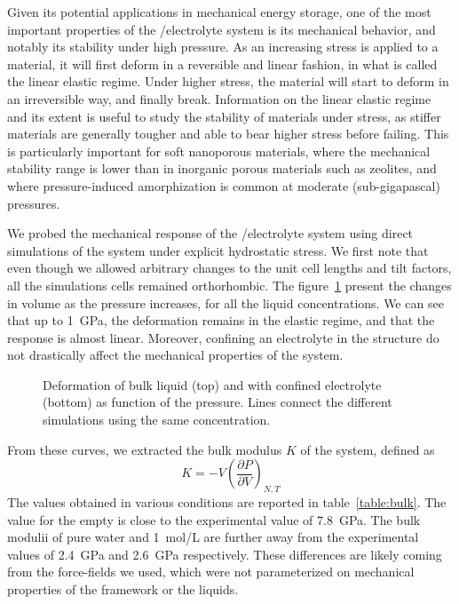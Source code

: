 \documentclass[thesis]{subfiles}
\begin{document}
Given its potential applications in mechanical energy storage, one of the most
important properties of the /electrolyte system is its mechanical behavior,
and notably its stability under high pressure. As an increasing stress is
applied to a material, it will first deform in a reversible and linear fashion,
in what is called the linear elastic regime. Under higher stress, the
material will start to deform in an irreversible way, and finally break.
Information on the linear elastic regime and its extent is useful to study the
stability of materials under stress, as stiffer materials are generally tougher
and able to bear higher stress before failing. This is particularly important
for soft nanoporous materials, where the mechanical stability range is lower
than in inorganic porous materials such as zeolites, and where pressure-induced
amorphization is common at moderate (sub-gigapascal)
pressures\cite{Bennett2011, Cao2012, AOrtiz2013}.

We probed the mechanical response of the /electrolyte system using direct
simulations of the system under explicit hydrostatic stress. We first note that
even though we allowed arbitrary changes to the unit cell lengths and tilt
factors, all the simulations cells remained orthorhombic. The figure~\ref{fig:licl-zif:pv}
present the changes in volume as the pressure increases, for all the liquid
concentrations. We can see that up to \SI{1}{GPa}, the deformation remains in
the elastic regime, and that the response is almost linear. Moreover, confining
an electrolyte in the  structure do not drastically affect the mechanical
properties of the system.

\begin{figure}[ht]
    \centering
    
    \caption{Deformation of bulk liquid (top) and  with confined electrolyte
    (bottom) as function of the pressure. Lines connect the different simulations
    using the same concentration.}
    \label{fig:licl-zif:pv}
\end{figure}

From these curves, we extracted the bulk modulus $K$ of the system, defined as
\[K = -V\left(\frac{\partial P}{\partial V}\right)_{N,T}\]
The values obtained in various conditions are reported in
table~\ref{table:bulk}. The value for the empty  is close to the
experimental\cite{Tan2012} value of \SI{7.8}{GPa}. The bulk modulii of pure
water and \SI{1}{mol/L} are further away from the experimental
values\cite{Lanman1934} of \SI{2.4}{GPa} and \SI{2.6}{GPa} respectively.
These differences are likely coming from the force-fields we used, which were
not parameterized on mechanical properties of the framework or the liquids.
\end{document}
